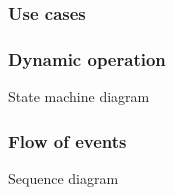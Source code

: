 \subsubsection{Use cases}
\label{sec:use-cases-2}

\subsubsection{Dynamic operation}
\label{sec:dyn-oper-2}
State machine diagram

\subsubsection{Flow of events}
\label{sec:flow-events-2}
Sequence diagram

